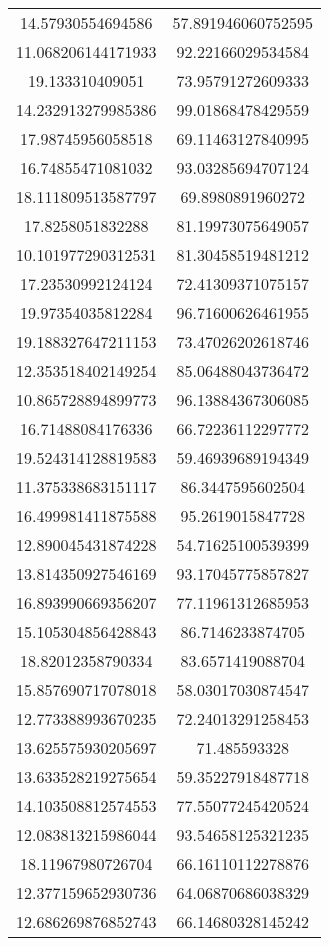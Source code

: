 \begin{table}
\begin{tabular}{cc}
14.57930554694586 & 57.891946060752595 \\
11.068206144171933 & 92.22166029534584 \\
19.133310409051 & 73.95791272609333 \\
14.232913279985386 & 99.01868478429559 \\
17.98745956058518 & 69.11463127840995 \\
16.74855471081032 & 93.03285694707124 \\
18.111809513587797 & 69.8980891960272 \\
17.8258051832288 & 81.19973075649057 \\
10.101977290312531 & 81.30458519481212 \\
17.23530992124124 & 72.41309371075157 \\
19.97354035812284 & 96.71600626461955 \\
19.188327647211153 & 73.47026202618746 \\
12.353518402149254 & 85.06488043736472 \\
10.865728894899773 & 96.13884367306085 \\
16.71488084176336 & 66.72236112297772 \\
19.524314128819583 & 59.46939689194349 \\
11.375338683151117 & 86.3447595602504 \\
16.499981411875588 & 95.2619015847728 \\
12.890045431874228 & 54.71625100539399 \\
13.814350927546169 & 93.17045775857827 \\
16.893990669356207 & 77.11961312685953 \\
15.105304856428843 & 86.7146233874705 \\
18.82012358790334 & 83.6571419088704 \\
15.857690717078018 & 58.03017030874547 \\
12.773388993670235 & 72.24013291258453 \\
13.625575930205697 & 71.485593328 \\
13.633528219275654 & 59.35227918487718 \\
14.103508812574553 & 77.55077245420524 \\
12.083813215986044 & 93.54658125321235 \\
18.11967980726704 & 66.16110112278876 \\
12.377159652930736 & 64.06870686038329 \\
12.686269876852743 & 66.14680328145242 \\

\end{tabular}
\end{table}
